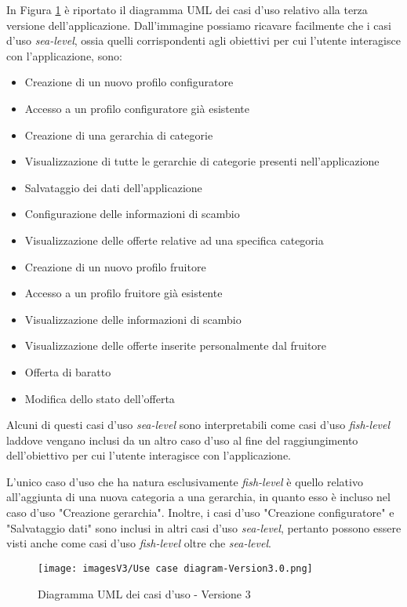 In Figura \ref{fig:Use Case 3} è riportato il diagramma UML dei casi d'uso relativo alla terza versione dell'applicazione. Dall'immagine possiamo ricavare facilmente che i casi d'uso \textit{sea-level}, ossia quelli corrispondenti agli obiettivi per cui l'utente interagisce con l'applicazione, sono:
\begin{itemize}
    \item Creazione di un nuovo profilo configuratore 
    \item Accesso a un profilo configuratore già esistente
    \item Creazione di una gerarchia di categorie
    \item Visualizzazione di tutte le gerarchie di categorie presenti nell'applicazione
    \item Salvataggio dei dati dell'applicazione
    \item Configurazione delle informazioni di scambio
    \item Visualizzazione delle offerte relative ad una specifica categoria
    \item Creazione di un nuovo profilo fruitore
    \item Accesso a un profilo fruitore già esistente
    \item Visualizzazione delle informazioni di scambio
    \item Visualizzazione delle offerte inserite personalmente dal fruitore
    \item Offerta di baratto
    \item Modifica dello stato dell'offerta  
\end{itemize}
Alcuni di questi casi d'uso \textit{sea-level} sono interpretabili come casi d'uso \textit{fish-level} laddove vengano inclusi da un altro caso d'uso al fine del raggiungimento dell'obiettivo per cui l'utente interagisce con l'applicazione.

L'unico caso d'uso che ha natura esclusivamente \textit{fish-level} è quello relativo all'aggiunta di una nuova categoria a una gerarchia, in quanto esso è incluso nel caso d'uso "Creazione gerarchia". Inoltre, i casi d'uso "Creazione configuratore" e "Salvataggio dati" sono inclusi in altri casi d'uso \textit{sea-level}, pertanto possono essere visti anche come casi d'uso \textit{fish-level} oltre che \textit{sea-level}.

\begin{figure}[ht]
\centering
\texttt{[image: imagesV3/Use case diagram-Version3.0.png]}
\caption{\label{fig:Use Case 3}Diagramma UML dei casi d'uso - Versione 3}
\end{figure}\bigskip

